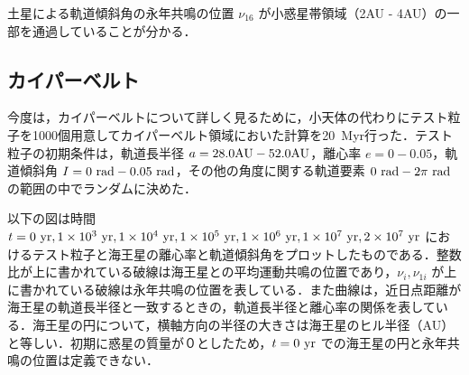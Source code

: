 \documentclass[11pt,a4paper,oneside,onecolumn]{jreport}
\begin{document}
土星による軌道傾斜角の永年共鳴の位置 $\nu_{16}$ が小惑星帯領域（2AU - 4AU）の一部を通過していることが分かる．

\subsection{カイパーベルト}
今度は，カイパーベルトについて詳しく見るために，小天体の代わりにテスト粒子を1000個用意してカイパーベルト領域においた計算を20\ Myr行った．テスト粒子の初期条件は，軌道長半径 $a = 28.0 {\rm AU} - 52.0 {\rm AU}$，離心率 $e = 0 - 0.05$，軌道傾斜角 $I = 0\ {\rm rad} - 0.05\ {\rm rad}$，その他の角度に関する軌道要素 $0\ {\rm rad} - 2 \pi\ {\rm rad}$ の範囲の中でランダムに決めた．

以下の図は時間 $t = 0\ {\rm yr}, 1 \times 10^3\ {\rm yr}, 1 \times 10^4\ {\rm yr}, 1 \times 10^5\ {\rm yr}, 1 \times 10^6\ {\rm yr}, 1 \times 10^7\ {\rm yr}, 2 \times 10^7\ {\rm yr}$ におけるテスト粒子と海王星の離心率と軌道傾斜角をプロットしたものである．整数比が上に書かれている破線は海王星との平均運動共鳴の位置であり，$\nu_i, \nu_{1i}$ が上に書かれている破線は永年共鳴の位置を表している．また曲線は，近日点距離が海王星の軌道長半径と一致するときの，軌道長半径と離心率の関係を表している．海王星の円について，横軸方向の半径の大きさは海王星のヒル半径（AU）と等しい．初期に惑星の質量が０としたため，$t = 0\ {\rm yr}$ での海王星の円と永年共鳴の位置は定義できない．
\end{document}
